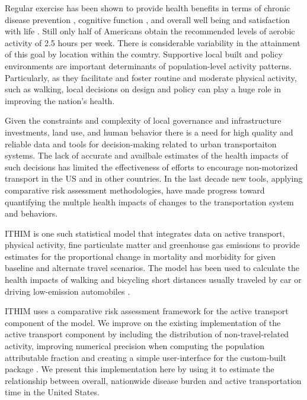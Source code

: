 Regular exercise has been shown to provide health benefits in terms of
chronic disease prevention \cite{warburton2006}, cognitive function
\cite{hillman2008}, and overall well being and satisfaction with life
\cite{maher2013}. Still only half of Americans obtain the recommended
levels of aerobic activity of 2.5 hours per week. There is
considerable variability in the attainment of this goal by location
within the country. Supportive local built and policy environments are
important determinants of population-level activity
patterns. Particularly, as they facilitate and foster routine and
moderate physical activity, such as walking, local decisions on design
and policy can play a huge role in improving the nation's health.

Given the constraints and complexity of local governance and
infrastructure investments, land use, and human behavior there is a
need for high quality and reliable data and tools for decision-making
related to urban transportaiton systems. The lack of accurate and
availbale estimates of the health impacts of such decisions has
limited the effectiveness of efforts to encourage non-motorized
transport in the US and in other countries. In the last decade new
tools, applying comparative risk assessment methodologies, have made
progress toward quantifying the multple health impacts of changes to
the transportation system and behaviors.

ITHIM is one such statistical model that integrates data on active
transport, physical activity, fine particulate matter and greenhouse
gas emissions to provide estimates for the proportional change in
mortality and morbidity for given baseline and alternate travel
scenarios. The model has been used to calculate the health impacts of
walking and bicycling short distances usually traveled by car or
driving low-emission automobiles \cite{woodcock2013,maizlish2013}.

ITHIM uses a comparative risk assessment framework for the active
transport component of the model.  We improve on the existing
implementation of the active transport component by including the
distribution of non-travel-related activity, improving numerical
precision when computing the population attributable fraction and
creating a simple user-interface for the custom-built \R{} package
\package{}.  We present this implementation here by using it to
estimate the relationship between overall, nationwide disease burden
and active transportation time in the United States.

